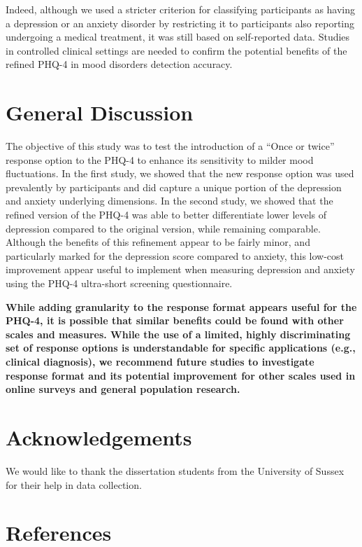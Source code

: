 \documentclass[
  jou,
  longtable,
  nolmodern,
  notxfonts,
  notimes,
  mask,
  colorlinks=true,linkcolor=blue,citecolor=blue,urlcolor=blue]{apa7}
\begin{document}
Indeed, although we used a stricter criterion for classifying
participants as having a depression or an anxiety disorder by
restricting it to participants also reporting undergoing a medical
treatment, it was still based on self-reported data. Studies in
controlled clinical settings are needed to confirm the potential
benefits of the refined PHQ-4 in mood disorders detection accuracy.

\section{General Discussion}\label{general-discussion}

The objective of this study was to test the introduction of a ``Once or
twice'' response option to the PHQ-4 to enhance its sensitivity to
milder mood fluctuations. In the first study, we showed that the new
response option was used prevalently by participants and did capture a
unique portion of the depression and anxiety underlying dimensions. In
the second study, we showed that the refined version of the PHQ-4 was
able to better differentiate lower levels of depression compared to the
original version, while remaining comparable. Although the benefits of
this refinement appear to be fairly minor, and particularly marked for
the depression score compared to anxiety, this low-cost improvement
appear useful to implement when measuring depression and anxiety using
the PHQ-4 ultra-short screening questionnaire.

\textbf{While adding granularity to the response format appears useful
for the PHQ-4, it is possible that similar benefits could be found with
other scales and measures. While the use of a limited, highly
discriminating set of response options is understandable for specific
applications (e.g., clinical diagnosis), we recommend future studies to
investigate response format and its potential improvement for other
scales used in online surveys and general population research.}

\section{Acknowledgements}\label{acknowledgements}

We would like to thank the dissertation students from the University of
Sussex for their help in data collection.

\section{References}\label{references}
\end{document}
